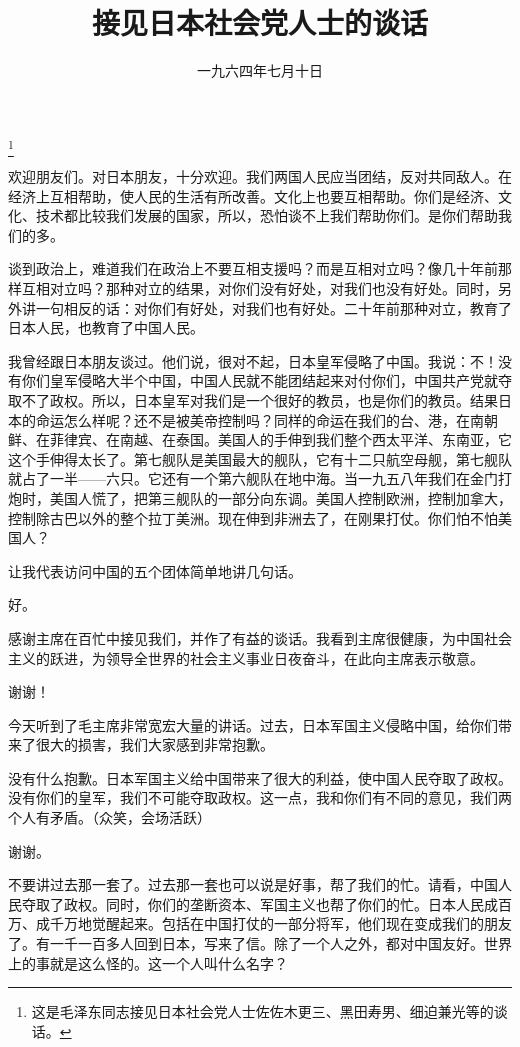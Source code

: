 
\title{接见日本社会党人士的谈话}
\date{一九六四年七月十日}
\thanks{这是毛泽东同志接见日本社会党人士佐佐木更三、黑田寿男、细迫兼光等的谈话。}
\maketitle


欢迎朋友们。对日本朋友，十分欢迎。我们两国人民应当团结，反对共同敌人。在经济上互相帮助，使人民的生活有所改善。文化上也要互相帮助。你们是经济、文化、技术都比较我们发展的国家，所以，恐怕谈不上我们帮助你们。是你们帮助我们的多。

谈到政治上，难道我们在政治上不要互相支援吗？而是互相对立吗？像几十年前那样互相对立吗？那种对立的结果，对你们没有好处，对我们也没有好处。同时，另外讲一句相反的话：对你们有好处，对我们也有好处。二十年前那种对立，教育了日本人民，也教育了中国人民。

我曾经跟日本朋友谈过。他们说，很对不起，日本皇军侵略了中国。我说：不！没有你们皇军侵略大半个中国，中国人民就不能团结起来对付你们，中国共产党就夺取不了政权。所以，日本皇军对我们是一个很好的教员，也是你们的教员。结果日本的命运怎么样呢？还不是被美帝控制吗？同样的命运在我们的台、港，在南朝鲜、在菲律宾、在南越、在泰国。美国人的手伸到我们整个西太平洋、东南亚，它这个手伸得太长了。第七舰队是美国最大的舰队，它有十二只航空母舰，第七舰队就占了一半——六只。它还有一个第六舰队在地中海。当一九五八年我们在金门打炮时，美国人慌了，把第三舰队的一部分向东调。美国人控制欧洲，控制加拿大，控制除古巴以外的整个拉丁美洲。现在伸到非洲去了，在刚果打仗。你们怕不怕美国人？

让我代表访问中国的五个团体简单地讲几句话。

好。

感谢主席在百忙中接见我们，并作了有益的谈话。我看到主席很健康，为中国社会主义的跃进，为领导全世界的社会主义事业日夜奋斗，在此向主席表示敬意。

谢谢！

今天听到了毛主席非常宽宏大量的讲话。过去，日本军国主义侵略中国，给你们带来了很大的损害，我们大家感到非常抱歉。

没有什么抱歉。日本军国主义给中国带来了很大的利益，使中国人民夺取了政权。没有你们的皇军，我们不可能夺取政权。这一点，我和你们有不同的意见，我们两个人有矛盾。（众笑，会场活跃）

谢谢。

不要讲过去那一套了。过去那一套也可以说是好事，帮了我们的忙。请看，中国人民夺取了政权。同时，你们的垄断资本、军国主义也帮了你们的忙。日本人民成百万、成千万地觉醒起来。包括在中国打仗的一部分将军，他们现在变成我们的朋友了。有一千一百多人回到日本，写来了信。除了一个人之外，都对中国友好。世界上的事就是这么怪的。这一个人叫什么名字？

